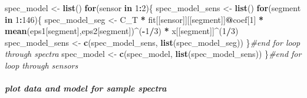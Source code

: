 \documentclass[]{article}
\newenvironment{Shaded}{\begin{snugshade}}{\end{snugshade}}
\newcommand{\KeywordTok}[1]{\textcolor[rgb]{0.13,0.29,0.53}{\textbf{#1}}}
\newcommand{\DecValTok}[1]{\textcolor[rgb]{0.00,0.00,0.81}{#1}}
\newcommand{\StringTok}[1]{\textcolor[rgb]{0.31,0.60,0.02}{#1}}
\newcommand{\CommentTok}[1]{\textcolor[rgb]{0.56,0.35,0.01}{\textit{#1}}}
\newcommand{\ControlFlowTok}[1]{\textcolor[rgb]{0.13,0.29,0.53}{\textbf{#1}}}
\newcommand{\OperatorTok}[1]{\textcolor[rgb]{0.81,0.36,0.00}{\textbf{#1}}}
\newcommand{\NormalTok}[1]{#1}
\let\oldsubparagraph\subparagraph
\renewcommand{\subparagraph}[1]{\oldsubparagraph{#1}\mbox{}}
\begin{document}
\begin{Shaded}
\begin{Highlighting}[]
\NormalTok{spec_model <-}\StringTok{ }\KeywordTok{list}\NormalTok{()}
\ControlFlowTok{for}\NormalTok{(sensor }\ControlFlowTok{in} \DecValTok{1}\OperatorTok{:}\DecValTok{2}\NormalTok{)\{}
\NormalTok{  spec_model_sens <-}\StringTok{ }\KeywordTok{list}\NormalTok{()}
  \ControlFlowTok{for}\NormalTok{(segment }\ControlFlowTok{in} \DecValTok{1}\OperatorTok{:}\DecValTok{146}\NormalTok{)\{}
\NormalTok{    spec_model_seg <-}\StringTok{  }\NormalTok{C_T }\OperatorTok{*}\StringTok{ }\NormalTok{fit[[sensor]][[segment]]}\OperatorTok{@}\NormalTok{coef[}\DecValTok{1}\NormalTok{] }\OperatorTok{*}\StringTok{ }\KeywordTok{mean}\NormalTok{(eps1[segment],eps2[segment])}\OperatorTok{^}\NormalTok{(}\OperatorTok{-}\DecValTok{1}\OperatorTok{/}\DecValTok{3}\NormalTok{) }\OperatorTok{*}\StringTok{ }\NormalTok{x[[segment]]}\OperatorTok{^}\NormalTok{(}\DecValTok{1}\OperatorTok{/}\DecValTok{3}\NormalTok{)}
\NormalTok{    spec_model_sens <-}\StringTok{ }\KeywordTok{c}\NormalTok{(spec_model_sens, }\KeywordTok{list}\NormalTok{(spec_model_seg))}
\NormalTok{  \}}\CommentTok{#end for loop through spectra}
\NormalTok{  spec_model <-}\StringTok{ }\KeywordTok{c}\NormalTok{(spec_model, }\KeywordTok{list}\NormalTok{(spec_model_sens))}
\NormalTok{\}}\CommentTok{#end for loop through sensors}
\end{Highlighting}
\end{Shaded}

\subparagraph{plot data and model for sample
spectra}\label{plot-data-and-model-for-sample-spectra}
\end{document}
